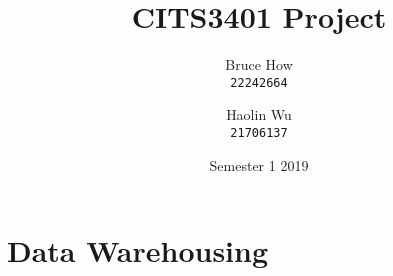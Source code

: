 \documentclass[12pt, a4paper]{article}
\title{
	CITS3401 Project
}
\author{
	Bruce How\\
	\texttt{22242664}
	\and
	Haolin Wu\\
	\texttt{21706137}
}
\date{Semester 1 2019}
\begin{document}
\maketitle

\section{Data Warehousing}
\end{document}
